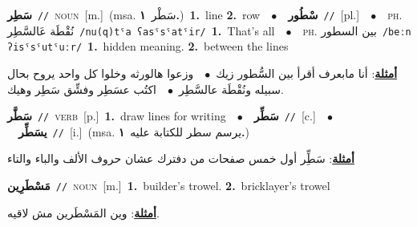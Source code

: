 \documentclass[10pt,a4paper,twoside]{article} %
\begin{document}
\begin{multicols}{2}
{\setlength\topsep{0pt}\textbf{\foreignlanguage{arabic}{سَطِر}}\ {\color{gray}\texttt{//}\color{black}}\ \textsc{noun}\ [m.]\ \color{gray}(msa. \foreignlanguage{arabic}{سَطْر}~\foreignlanguage{arabic}{\textbf{١.}})\color{black}\ \textbf{1.}~line  \textbf{2.}~row\ \ $\bullet$\ \ \setlength\topsep{0pt}\textbf{\foreignlanguage{arabic}{سْطُور}}\ {\color{gray}\texttt{//}\color{black}}\ [pl.]\ \ $\bullet$\ \ \textsc{ph.} \color{gray} \foreignlanguage{arabic}{نُقْطَة عَالسَّطِر}\color{black}\ {\color{gray}\texttt{/{\sffamily nu(q)tˤa ʕasˤsˤatˤir}/}\color{black}}\ \textbf{1.}~That's all\ \ $\bullet$\ \ \textsc{ph.} \color{gray} \foreignlanguage{arabic}{بين السطور}\color{black}\ {\color{gray}\texttt{/{\sffamily beːn ʔisˤsˤutˤuːr}/}\color{black}}\ \textbf{1.}~hidden meaning.  \textbf{2.}~between the lines\  \begin{flushright}\color{gray}\foreignlanguage{arabic}{\textbf{\underline{\foreignlanguage{arabic}{أمثلة}}}: أنا مابعرف أقرأ بين السُّطور زيك\ $\bullet$\ \  وزعوا هالورثه وخلوا كل واحد يروح بحال سبيله ونُقْطَة عالسَّطِر\ $\bullet$\ \  اكتُب عسَطِر وفشِّق سَطِر وهيك.}\end{flushright}\color{black}} \vspace{2mm}

{\setlength\topsep{0pt}\textbf{\foreignlanguage{arabic}{سَطَّر}}\ {\color{gray}\texttt{//}\color{black}}\ \textsc{verb}\ [p.]\ \textbf{1.}~draw lines for writing\ \ $\bullet$\ \ \setlength\topsep{0pt}\textbf{\foreignlanguage{arabic}{سَطِّر}}\ {\color{gray}\texttt{//}\color{black}}\ [c.]\ \ $\bullet$\ \ \setlength\topsep{0pt}\textbf{\foreignlanguage{arabic}{يسَطِّر}}\ {\color{gray}\texttt{//}\color{black}}\ [i.]\ \color{gray}(msa. \foreignlanguage{arabic}{يرسم سطر للكتابة عليه}~\foreignlanguage{arabic}{\textbf{١.}})\color{black}\  \begin{flushright}\color{gray}\foreignlanguage{arabic}{\textbf{\underline{\foreignlanguage{arabic}{أمثلة}}}: سَطِِّر أول خمس صفحات من دفترك عشان حروف الألف والباء والتاء}\end{flushright}\color{black}} \vspace{2mm}

{\setlength\topsep{0pt}\textbf{\foreignlanguage{arabic}{مَسْطَرِين}}\ {\color{gray}\texttt{//}\color{black}}\ \textsc{noun}\ [m.]\ \textbf{1.}~builder's trowel.  \textbf{2.}~bricklayer's trowel\  \begin{flushright}\color{gray}\foreignlanguage{arabic}{\textbf{\underline{\foreignlanguage{arabic}{أمثلة}}}: وين المَسْطَرين مش لاقيه.}\end{flushright}\color{black}} \vspace{2mm}


\end{multicols}
\end{document}
